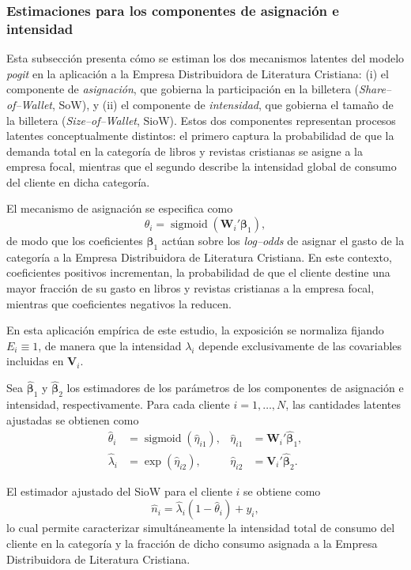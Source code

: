 \subsubsection{Estimaciones para los componentes de asignación  e intensidad}
    Esta subsección presenta cómo se estiman los dos mecanismos latentes del modelo \emph{pogit} en la aplicación a la Empresa Distribuidora de Literatura Cristiana: (i) el componente de \emph{asignación}, que gobierna la participación en la billetera (\emph{Share--of--Wallet}, SoW), y (ii) el componente de \emph{intensidad}, que gobierna el tamaño de la billetera (\emph{Size--of--Wallet}, SioW). Estos dos componentes representan procesos latentes conceptualmente distintos: el primero captura la probabilidad de que la demanda total en la categoría de libros y revistas cristianas se asigne a la empresa focal, mientras que el segundo describe la intensidad global de consumo del cliente en dicha categoría.
    
    El mecanismo de asignación se especifica como
    \[
    \theta_i 
    = 
    \operatorname{sigmoid}\!\left(\boldsymbol{W}_i' \boldsymbol{\beta}_1\right),
    \]
    de modo que los coeficientes \(\boldsymbol{\beta}_1\) actúan sobre los \emph{log--odds} de asignar el gasto de la categoría a la Empresa Distribuidora de Literatura Cristiana. En este contexto, coeficientes positivos incrementan,  la probabilidad de que el cliente destine una mayor fracción de su gasto en libros y revistas cristianas a la empresa focal, mientras que coeficientes negativos la reducen.
    
    En esta aplicación empírica de este estudio, la exposición se normaliza fijando \(E_i \equiv 1\), de manera que la intensidad \(\lambda_i\) depende exclusivamente de las covariables incluidas en \(\boldsymbol{V}_i\).
    
    Sea \(\hat{\boldsymbol{\beta}}_1\) y \(\hat{\boldsymbol{\beta}}_2\) los estimadores de los parámetros de los componentes de asignación e intensidad, respectivamente. Para cada cliente \(i = 1, \ldots, N\), las cantidades latentes ajustadas se obtienen como
    \begin{equation*}
    \begin{aligned}
    \hat{\theta}_i 
    &= 
    \operatorname{sigmoid}(\hat{\eta}_{i1}),
    &
    \hat{\eta}_{i1} 
    &= 
    \boldsymbol{W}_i' \hat{\boldsymbol{\beta}}_1,
    \\
    \hat{\lambda}_i 
    &= 
    \exp(\hat{\eta}_{i2}),
    &
    \hat{\eta}_{i2} 
    &= 
    \boldsymbol{V}_i' \hat{\boldsymbol{\beta}}_2.
    \end{aligned}
    \end{equation*}
    
    El estimador ajustado del SioW para el cliente \(i\) se obtiene como
    \[
    \hat{n}_i 
    = 
    \hat{\lambda}_i (1 - \hat{\theta}_i) + y_i,
    \]
    lo cual permite caracterizar simultáneamente la intensidad total de consumo del cliente en la categoría y la fracción de dicho consumo asignada a la Empresa Distribuidora de Literatura Cristiana.
    
    
    
